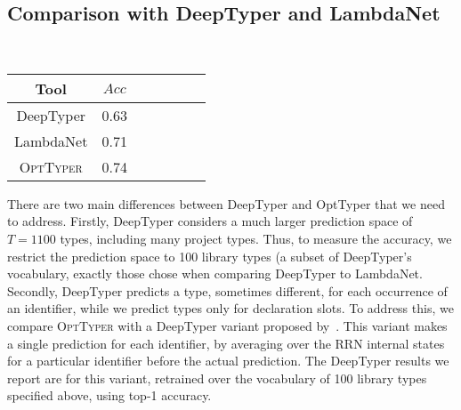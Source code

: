 \documentclass[acmsmall, review, anonymous]{acmart}\settopmatter{printfolios=true,printccs=false,printacmref=false}
\newcommand{\projectname}{\textsc{OptTyper}\xspace}
\begin{document}
\subsection{Comparison with DeepTyper and  LambdaNet}~\label{ssec:typesubproblem}

\begin{table*}[t]
	\centering
	\caption{Accuracy for DeepTyper, LambdaNet and OptTyper; on $600$ annotations slots.}
		\label{tab:typeacc2}
	\begin{tabular}{ccccccc}
		\toprule
		Tool   &                              $Acc$ \\
		\midrule
		DeepTyper  & 0.63 \\
		LambdaNet  & 0.71 \\
		\projectname & 0.74\\
		\bottomrule
	\end{tabular}
\end{table*}

There are two main differences between DeepTyper 
and OptTyper that we need to address. Firstly, DeepTyper considers a much larger prediction space of $T=1100$ types, including many project types. Thus, to measure the accuracy, we restrict the prediction space to 100 library types (a subset of DeepTyper's vocabulary, exactly those \citet{wei20} chose when comparing DeepTyper to LambdaNet.
Secondly, DeepTyper predicts a type, sometimes different, for each occurrence of an identifier, while we predict types only for declaration slots. To address this, we compare \projectname{} with a DeepTyper variant proposed by~\citet{wei20}.
This variant makes a single prediction for each identifier, by averaging over the RRN internal states for a particular identifier before the actual prediction.
The DeepTyper results we report are for this variant, retrained over the vocabulary of 100 library types specified above, using top-1 accuracy.
\end{document}

